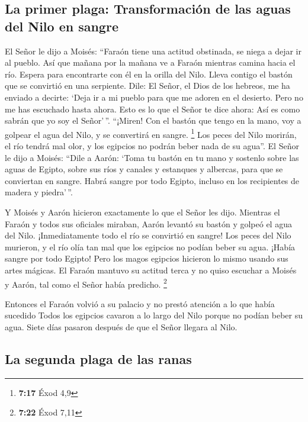 \hypertarget{la-primer-plaga-transformaciuxf3n-de-las-aguas-del-nilo-en-sangre}{%
\subsection{La primer plaga: Transformación de las aguas del Nilo en
sangre}\label{la-primer-plaga-transformaciuxf3n-de-las-aguas-del-nilo-en-sangre}}

 El Señor le dijo a Moisés: ``Faraón tiene una actitud
obstinada, se niega a dejar ir al pueblo.  Así que mañana
por la mañana ve a Faraón mientras camina hacia el río. Espera para
encontrarte con él en la orilla del Nilo. Lleva contigo el bastón que se
convirtió en una serpiente.  Dile: El Señor, el Dios de
los hebreos, me ha enviado a decirte: `Deja ir a mi pueblo para que me
adoren en el desierto. Pero no me has escuchado hasta ahora.
 Esto es lo que el Señor te dice ahora: Así es como
sabrán que yo soy el Señor'\,''. ``¡Miren! Con el bastón que tengo en la
mano, voy a golpear el agua del Nilo, y se convertirá en sangre.
\footnote{\textbf{7:17} Éxod 4,9}  Los peces del Nilo
morirán, el río tendrá mal olor, y los egipcios no podrán beber nada de
su agua''.  El Señor le dijo a Moisés: ``Dile a Aarón:
`Toma tu bastón en tu mano y sostenlo sobre las aguas de Egipto, sobre
sus ríos y canales y estanques y albercas, para que se conviertan en
sangre. Habrá sangre por todo Egipto, incluso en los recipientes de
madera y piedra'\,''.

 Y Moisés y Aarón hicieron exactamente lo que el Señor
les dijo. Mientras el Faraón y todos sus oficiales miraban, Aarón
levantó su bastón y golpeó el agua del Nilo. ¡Inmediatamente todo el río
se convirtió en sangre!  Los peces del Nilo murieron, y
el río olía tan mal que los egipcios no podían beber su agua. ¡Había
sangre por todo Egipto!  Pero los magos egipcios hicieron
lo mismo usando sus artes mágicas. El Faraón mantuvo su actitud terca y
no quiso escuchar a Moisés y Aarón, tal como el Señor había predicho.
\footnote{\textbf{7:22} Éxod 7,11}

 Entonces el Faraón volvió a su palacio y no prestó
atención a lo que había sucedido  Todos los egipcios
cavaron a lo largo del Nilo porque no podían beber su agua.
 Siete días pasaron después de que el Señor llegara al
Nilo.

\hypertarget{la-segunda-plaga-de-las-ranas}{%
\subsection{La segunda plaga de las
ranas}\label{la-segunda-plaga-de-las-ranas}}

